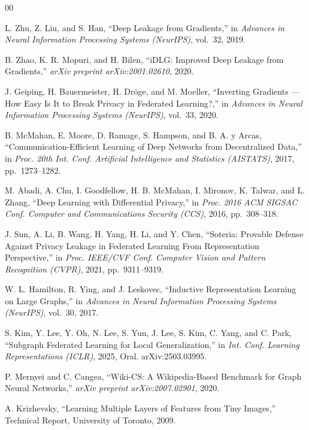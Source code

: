 \documentclass[conference]{IEEEtran}
\begin{document}
\begin{thebibliography}{00}

L. Zhu, Z. Liu, and S. Han, ``Deep Leakage from Gradients,'' in
\textit{Advances in Neural Information Processing Systems (NeurIPS)}, vol.~32,
2019.

B. Zhao, K. R. Mopuri, and H. Bilen, ``iDLG: Improved Deep Leakage from
Gradients,'' \textit{arXiv preprint arXiv:2001.02610}, 2020.

J. Geiping, H. Bauermeister, H. Dr\"oge, and M. Moeller, ``Inverting
Gradients --- How Easy Is It to Break Privacy in Federated Learning?,'' in
\textit{Advances in Neural Information Processing Systems (NeurIPS)}, vol.~33,
2020.

B. McMahan, E. Moore, D. Ramage, S. Hampson, and B. A. y Arcas,
``Communication-Efficient Learning of Deep Networks from Decentralized Data,''
in \textit{Proc. 20th Int. Conf. Artificial Intelligence and Statistics
(AISTATS)}, 2017, pp.~1273--1282.

M. Abadi, A. Chu, I. Goodfellow, H. B. McMahan, I. Mironov, K. Talwar, and
L. Zhang, ``Deep Learning with Differential Privacy,'' in \textit{Proc. 2016
ACM SIGSAC Conf. Computer and Communications Security (CCS)}, 2016,
pp.~308--318.

J. Sun, A. Li, B. Wang, H. Yang, H. Li, and Y. Chen, ``Soteria: Provable
Defense Against Privacy Leakage in Federated Learning From Representation
Perspective,'' in \textit{Proc. IEEE/CVF Conf. Computer Vision and Pattern
Recognition (CVPR)}, 2021, pp.~9311--9319.

W. L. Hamilton, R. Ying, and J. Leskovec, ``Inductive Representation Learning
on Large Graphs,'' in \textit{Advances in Neural Information Processing Systems
(NeurIPS)}, vol.~30, 2017.

S. Kim, Y. Lee, Y. Oh, N. Lee, S. Yun, J. Lee, S. Kim, C. Yang, and C. Park,
``Subgraph Federated Learning for Local Generalization,'' in \textit{Int. Conf.
Learning Representations (ICLR)}, 2025, Oral. arXiv:2503.03995.

P. Mernyei and C. Cangea, ``Wiki-CS: A Wikipedia-Based Benchmark for Graph
Neural Networks,'' \textit{arXiv preprint arXiv:2007.02901}, 2020.

A. Krizhevsky, ``Learning Multiple Layers of Features from Tiny Images,''
Technical Report, University of Toronto, 2009.

\end{thebibliography}
\end{document}
